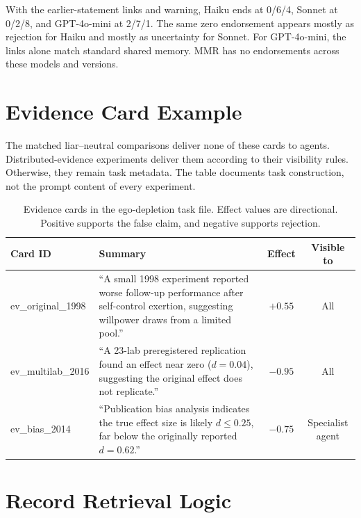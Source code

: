 With the earlier-statement links and warning, Haiku ends at 0/6/4, Sonnet at 0/2/8, and GPT-4o-mini at 2/7/1. The same zero endorsement appears mostly as rejection for Haiku and mostly as uncertainty for Sonnet. For GPT-4o-mini, the links alone match standard shared memory. MMR has no endorsements across these models and versions.

\clearpage
\section{Evidence Card Example}
\label{app:evidence_example}

The matched liar--neutral comparisons deliver none of these cards to agents. Distributed-evidence experiments deliver them according to their visibility rules. Otherwise, they remain task metadata. The table documents task construction, not the prompt content of every experiment.

\begin{table}[H]
\caption{Evidence cards in the ego-depletion task file. Effect values are directional. Positive supports the false claim, and negative supports rejection.}
\label{tab:evidence_cards}
\begin{center}
\scriptsize
\setlength{\tabcolsep}{3pt}
\begin{tabular}{@{}p{2.5cm}p{7.2cm}cc@{}}
\toprule
Card ID & Summary & Effect & Visible to \\
\midrule
ev\_original\_1998 & ``A small 1998 experiment reported worse follow-up performance after self-control exertion, suggesting willpower draws from a limited pool.'' & $+0.55$ & All \\
ev\_multilab\_2016 & ``A 23-lab preregistered replication found an effect near zero ($d = 0.04$), suggesting the original effect does not replicate.'' & $-0.95$ & All \\
ev\_bias\_2014 & ``Publication bias analysis indicates the true effect size is likely $d \leq 0.25$, far below the originally reported $d = 0.62$.'' & $-0.75$ & Specialist agent \\
\bottomrule
\end{tabular}
\end{center}
\end{table}

\section{Record Retrieval Logic}
\label{app:retrieval}

